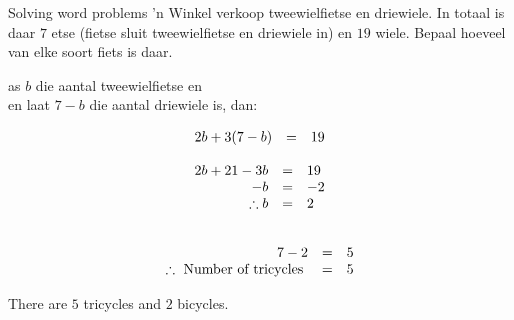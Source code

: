 \begin{wex}
{Solving word problems}
{
 ’n Winkel verkoop tweewielfietse en driewiele. In totaal is daar $7$ etse (fietse sluit tweewielfietse en driewiele in) en $19$ wiele. Bepaal hoeveel van elke soort fiets is daar.
}
{
as $b$ die aantal tweewielfietse en  \\
en laat $7-b$  die aantal driewiele is, dan: 

\begin{equation*}
\begin{array}{ccc}\hfill 2b+3(7-b)& =& 19\hfill \end{array}
\end{equation*}


\begin{equation*}
\begin{array}{ccl}
 \hfill 2b + 21 - 3b& =& 19\hfill \\
\hfill - b& =& -2\hfill \\
 \hfill \therefore b& =& 2\hfill 
\end{array}
\end{equation*}

\begin{equation*}
\begin{array}{ccl}
\\ \hfill  7 - 2 & =& 5\hfill \\
 \therefore \mbox{ Number of tricycles }& =& 5
\end{array}
\end{equation*}

 There are $5$ tricycles and $2$ bicycles.

}       
\end{wex}

